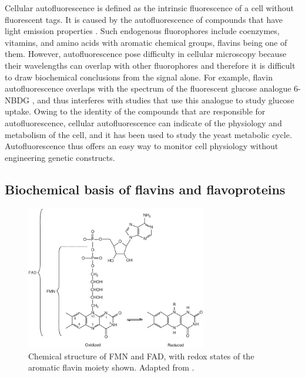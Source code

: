 Cellular autofluorescence is defined as the intrinsic fluorescence of a cell without fluorescent tags.
It is caused by the autofluorescence of compounds that have light emission properties \parencite{maslankaAutofluorescenceYeastSaccharomyces2018}.
Such endogenous fluorophores include coenzymes, vitamins, and amino acids with aromatic chemical groups, flavins being one of them.
However, autofluorescence pose difficulty in cellular microscopy because their wavelengths can overlap with other fluorophores and therefore it is difficult to draw biochemical conclusions from the signal alone.
For example, flavin autofluorescence overlaps with the spectrum of the fluorescent glucose analogue 6-NBDG \parencite{maslankaAutofluorescenceYeastSaccharomyces2018}, and thus interferes with studies that use this analogue to study glucose uptake.
Owing to the identity of the compounds that are responsible for autofluorescence, cellular autofluorescence can indicate of the physiology and metabolism of the cell, and it has been used to study the yeast metabolic cycle.
Autofluorescence thus offers an easy way to monitor cell physiology without engineering genetic constructs.

\subsection{Biochemical basis of flavins and flavoproteins}
\label{subsec:intro-flavin-biochem}

\begin{figure}
  \centering
  \includegraphics[width=0.7\textwidth]{patelFlavinContainingOxidativeBiocatalysts2006_1}
  \caption[
    Chemical structure of FMN and FAD
  ]{
    Chemical structure of FMN and FAD, with redox states of the aromatic flavin moiety shown.
    Adapted from \textcite{patelFlavinContainingOxidativeBiocatalysts2006}.}
  \label{fig:intro-flavin-structure}
\end{figure}

